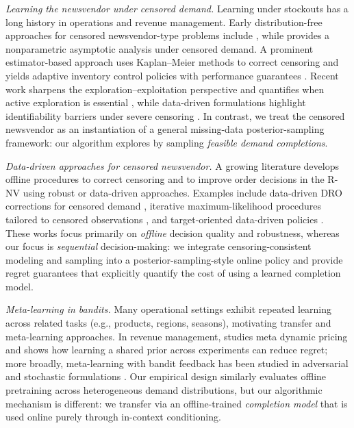 \documentclass[11pt]{article}
\begin{document}
\emph{Learning the newsvendor under censored demand.}
Learning under stockouts has a long history in operations and revenue management.
Early distribution-free approaches for censored newsvendor-type problems include \citet{godfrey2001adaptive},
while \citet{huh2009nonparametric} provides a nonparametric asymptotic analysis under censored demand.
A prominent estimator-based approach uses Kaplan--Meier methods to correct censoring and yields adaptive inventory control
policies with performance guarantees \citep{kaplan1958nonparametric,huh2011adaptive}.
Recent work sharpens the exploration--exploitation perspective and quantifies when active exploration is essential
\citep{besbes2022tradeoff}, while data-driven formulations highlight identifiability barriers under severe censoring
\citep{hssaine2024censored}.
In contrast, we treat the censored newsvendor as an instantiation of a general missing-data posterior-sampling framework:
our algorithm explores by sampling \emph{feasible demand completions}. 


\emph{Data-driven approaches for censored newsvendor.}
A growing literature develops offline procedures to correct censoring and to improve order decisions in the R-NV using robust or data-driven approaches.
Examples include data-driven DRO corrections for censored demand \citep{su2025bridging}, iterative maximum-likelihood
procedures tailored to censored observations \citep{clausen2025iterative}, and target-oriented data-driven policies
\citep{wang2025target}.
These works focus primarily on \emph{offline} decision quality and robustness, whereas our focus is \emph{sequential}
decision-making: we integrate censoring-consistent modeling and sampling into a posterior-sampling-style online policy and
provide regret guarantees that explicitly quantify the cost of using a learned completion model.

\emph{Meta-learning in bandits.}
Many operational settings exhibit repeated learning across related tasks (e.g., products, regions, seasons), motivating
transfer and meta-learning approaches.
In revenue management, \citet{bastani2022metapricing} studies meta dynamic pricing and shows how learning a shared prior
across experiments can reduce regret; more broadly, meta-learning with bandit feedback has been studied in adversarial and
stochastic formulations \citep{kveton2021meta, khodak2023metalearningbandits}.
Our empirical design similarly evaluates offline pretraining across heterogeneous demand distributions, but our algorithmic
mechanism is different: we transfer via an offline-trained \emph{completion model} that is used online purely through
in-context conditioning.
\end{document}
